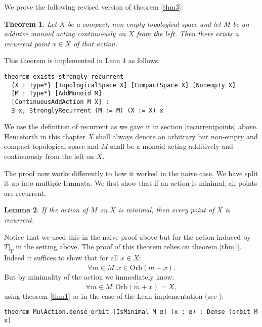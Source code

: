 \documentclass[11pt]{article}
\newtheorem{theorem}{Theorem}[section]
\newtheorem{lemma}[theorem]{Lemma}
\theoremstyle{definition}              %
\theoremstyle{definition}              %
\theoremstyle{definition}              %
\begin{document}
We prove the following revised version of theorem \ref{thm3}:

\begin{theorem}
    Let $X$ be a compact, non-empty topological space and let $M$ be an additive monoid acting continuously on $X$ from the left. Then there exists a recurrent point $x \in X$ of that action.
\end{theorem}

This theorem is implemented in Lean 4 as follows:

\begin{lstlisting}
theorem exists_strongly_recurrent
  {X : Type*} [TopologicalSpace X] [CompactSpace X] [Nonempty X]
  {M : Type*} [AddMonoid M]
  [ContinuousAddAction M X] :
  ∃ x, StronglyRecurrent (M := M) (X := X) x
\end{lstlisting}

We use the definition of recurrent as we gave it in section \ref{recurrentpoints} above. Henceforth in this chapter $X$ shall always denote an arbitrary but non-empty and compact topological space and $M$ shall be a monoid acting additively and continuously from the left on $X$.

The proof now works differently to how it worked in the naive case. We have split it up into multiple lemmata. We first show that if an action is minimal, all points are recurrent.

\begin{lemma}\label{lem1}
    If the action of $M$ on $X$ is minimal, then every point of $X$ is recurrent.
\end{lemma}

Notice that we used this in the naive proof above but for the action induced by $T|_Y$ in the setting above. The proof of this theorem relies on theorem \ref{thm1}. Indeed it suffices to show that for all $x \in X$:
\begin{equation}
    \forall m \in M: x \in \overline{\text{Orb}(m+x)}.
\end{equation}
But by minimality of the action we immediately know:
\begin{equation}
    \forall m \in M:\overline{\text{Orb}(m+x)}=X,
\end{equation}
using theorem \ref{thm1} or in the case of the Lean implementation (see \cite{kudry}):

\begin{lstlisting}
theorem MulAction.dense_orbit [IsMinimal M α] (x : α) : Dense (orbit M x)
\end{lstlisting}
\end{document}
